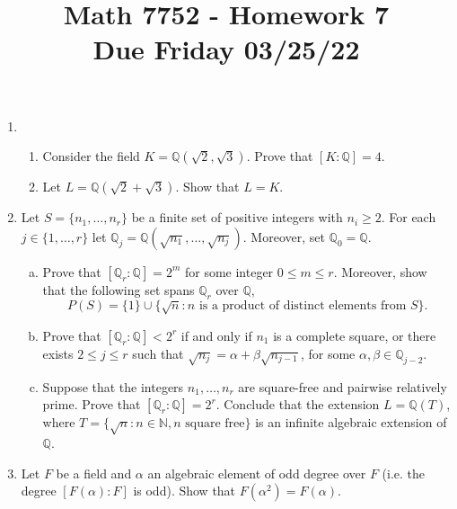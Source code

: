 \documentclass[12pt,
psamsfonts]{amsart}
\title{Math 7752 - Homework 7\\
Due Friday 03/25/22}
\theoremstyle{remark}
\theoremstyle{definition}
\newcommand{\N}{\mathbb{N}\xspace}
\newcommand{\Q}{\mathbb{Q}\xspace}
\numberwithin{equation}{section}
\begin{document}
\maketitle


\begin{enumerate}
\item
\begin{enumerate}
\item Consider the field $K=\Q(\sqrt{2},\sqrt{3})$. Prove that $[K:\Q]=4$.
\item Let $L=\Q(\sqrt{2}+\sqrt{3})$. Show that $L=K$.
\end{enumerate}
\medskip
\item Let $S=\{n_1,\ldots, n_r\}$ be a finite set of positive integers with $n_i\geq 2$. For each $j\in\{1,\ldots,r\}$ let $\Q_j=\Q(\sqrt{n_1},\ldots,\sqrt{n_j})$. Moreover, set $\Q_0=\Q$.
 \begin{enumerate}
[(a)]\item Prove that $[\Q_r:\Q]=2^m$ for some integer $0\leq m\leq r$. Moreover, show that the following set spans $\Q_r$ over $\Q$, \[P(S)=\{1\}\cup\{\sqrt{n}:n\text{ is a product of distinct elements from }S\}.\]
\item Prove that $[\Q_r:\Q]<2^r$ if and only if $n_1$ is a complete square, or there exists $2\leq j\leq r$ such that $\sqrt{n_j}=\alpha+\beta\sqrt{n_{j-1}}$, for some $\alpha,\beta\in\Q_{j-2}$.
\item Suppose that the integers $n_1,\ldots, n_r$ are square-free and pairwise relatively prime. Prove that $[\Q_r:\Q]=2^r$. Conclude that the extension $L=\Q(T)$, where $T=\{\sqrt{n}:n\in\N, n \text{ square free}\}$ is an infinite algebraic extension of $\Q$.
\end{enumerate}
\medskip
\item Let $F$ be a field and $\alpha$ an algebraic element of odd degree over $F$ (i.e. the degree $[F(\alpha):F]$ is odd). Show that $F(\alpha^2)=F(\alpha)$. \\


\end{enumerate}
\end{document}
